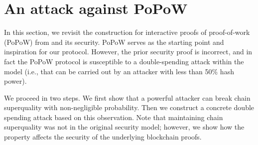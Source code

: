 \section{An attack against PoPoW \cite{KLS}}
\label{sec:attack}

In this section, we revisit the construction for interactive proofs of
proof-of-work (PoPoW) from \cite{KLS} and its security.
PoPoW serves as the starting point and inspiration for our protocol.
However, the prior security proof is incorrect, and in fact the PoPoW protocol is susceptible to a double-spending attack within the model (i.e., that can be carried out by an attacker with less than 50\% hash power).

We proceed in two steps. We first show that a powerful attacker can break chain
superquality with non-negligible probability. Then we construct a concrete
double spending  attack based on this observation. Note that maintaining   chain
superquality was  not in the original security model; however, we show how the
property affects the security of the underlying blockchain proofs. %

